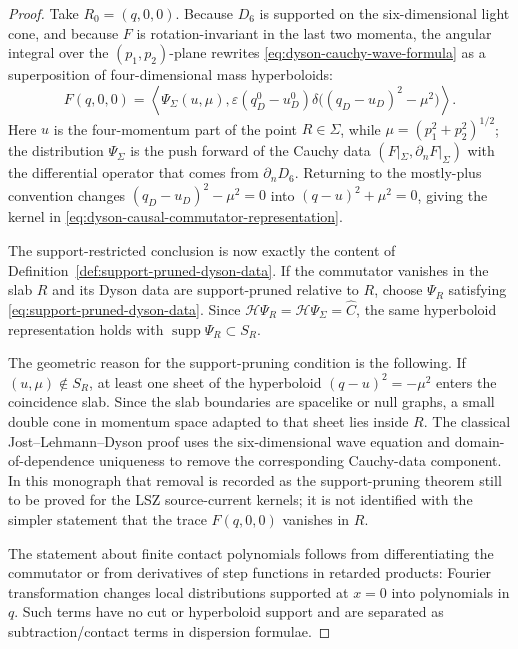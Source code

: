 \begin{proof}
Take \(R_0=(q,0,0)\).  Because \(D_6\) is supported on the
six-dimensional light cone, and because \(F\) is rotation-invariant in the
last two momenta, the angular integral over the \((p_1,p_2)\)-plane rewrites
\eqref{eq:dyson-cauchy-wave-formula} as a superposition of four-dimensional
mass hyperboloids:
\begin{equation}
  F(q,0,0)
  =
  \left\langle
    \Psi_\Sigma(u,\mu),
    \varepsilon(q_D^0-u_D^0)
    \delta\!\bigl((q_D-u_D)^2-\mu^2\bigr)
  \right\rangle .
  \label{eq:dyson-mostly-minus-hyperboloid-representation}
\end{equation}
Here \(u\) is the four-momentum part of the point \(R\in\Sigma\), while
\(\mu=(p_1^2+p_2^2)^{1/2}\); the distribution \(\Psi_\Sigma\) is the push
forward of the Cauchy data
\((F|_\Sigma,\partial_nF|_\Sigma)\) with the differential operator that comes
from \(\partial_nD_6\).  Returning to the mostly-plus convention changes
\((q_D-u_D)^2-\mu^2=0\) into
\((q-u)^2+\mu^2=0\), giving the kernel in
\eqref{eq:dyson-causal-commutator-representation}.

The support-restricted conclusion is now exactly the content of
Definition~\ref{def:support-pruned-dyson-data}.  If the commutator vanishes
in the slab \(R\) and its Dyson data are support-pruned relative to \(R\),
choose \(\Psi_R\) satisfying
\eqref{eq:support-pruned-dyson-data}.  Since
\(\mathcal H\Psi_R=\mathcal H\Psi_\Sigma=\widehat C\), the same
hyperboloid representation holds with
\(\operatorname{supp}\Psi_R\subset S_R\).

The geometric reason for the support-pruning condition is the following.
If \((u,\mu)\notin S_R\), at least one sheet of the hyperboloid
\((q-u)^2=-\mu^2\) enters the coincidence slab.  Since the slab boundaries
are spacelike or null graphs, a small double cone in momentum space adapted
to that sheet lies inside \(R\).  The classical Jost--Lehmann--Dyson proof
uses the six-dimensional wave equation and domain-of-dependence uniqueness
to remove the corresponding Cauchy-data component.  In this monograph that
removal is recorded as the support-pruning theorem still to be proved for
the LSZ source-current kernels; it is not identified with the simpler
statement that the trace \(F(q,0,0)\) vanishes in \(R\).

The statement about finite contact polynomials follows from differentiating
the commutator or from derivatives of step functions in retarded products:
Fourier transformation changes local distributions supported at \(x=0\) into
polynomials in \(q\).  Such terms have no cut or hyperboloid support and are
separated as subtraction/contact terms in dispersion formulae.
\end{proof}

